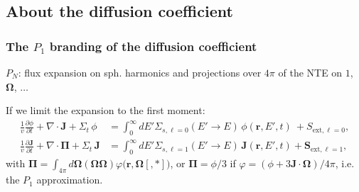 \documentclass[black]{slideCEA}
\newcommand{\bOm}{\boldsymbol{\Omega}}
\begin{document}
% 


\subsection{About the diffusion coefficient}
%
\begin{frame}%
  \frametitle{The $P_1$ branding of the diffusion coefficient}
  \begin{alertblock}{} \large
  $P_N$: flux expansion on sph. harmonics and projections over $4\pi$ of the NTE on $1$, $\bOm$, $\ldots$
  \end{alertblock}
  \begin{block}{If we limit the expansion to the first moment:}
  {
  \begin{align}[left=\empheqlbrace]
  \frac{1}{v} \frac{\partial \phi}{\partial t} + \nabla \cdot \mathbf{J} + \Sigma_t\, \phi &=
  \int_0^{\infty} {dE' \Sigma_{s,\ell=0}(E' \rightarrow E)\,\phi(\mathbf{r}, E', t) \ }
  + S_{\text{ext},\ell = 0},\label{eq:sflx}\\[3mm]
  \frac{1}{v} \frac{\partial \mathbf{J}}{\partial t} + \nabla \cdot \boldsymbol{\Pi} + \Sigma_t\, \mathbf{J} &= \int_0^{\infty} {dE' \Sigma_{s,\ell=1}(E' \rightarrow E)\, \mathbf{J}(\mathbf{r}, E', t)} + \mathbf{S}_{\text{ext},\ell = 1},\label{eq:curr}
  \end{align}
  }\vspace{5mm}
  with $\boldsymbol{\Pi} = \int_{4\pi}{d \bOm (\bOm \bOm)\varphi(\mathbf{r}, \bOm}[, \ast])$,
  or \textcolor{ceablue1}{$\boldsymbol{\Pi} = \phi / 3$} if
  \textcolor{ceablue1}{$\varphi = \left( \phi + 3 \mathbf{J} \cdot \bOm \right)/4\pi$},
  i.e. the \textcolor{ceared1}{$P_1$ approximation}.\vspace{5mm}

  \vspace{5mm}

  \end{block}
\end{frame}
\end{document}
